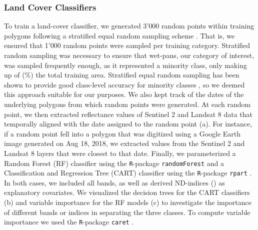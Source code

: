 \documentclass[abstract=on,10pt,a4paper,bibliography=totocnumbered]{article}
\newcommand{\inputy}[1]{\unskip}
\begin{document}
\begin{table}[h]
  \begin{center}
  \caption{We computed normalized difference indices between certain bands,
  hoping they would improve the land-cover classifiers. Depending on the
  satellite, we used different bands to compute similar indices. The function to
  compute a normalized difference between bands $b_1$ and $b_2$ is given by
  $\frac{b1 - b2}{b1 + b2}$.}
  \label{ND}
  \begin{threeparttable}[h]
    
  \end{threeparttable}
  \end{center}
\end{table}

\subsubsection{Land Cover Classifiers}

To train a land-cover classifier, we generated 3'000 random points within
training polygons following a stratified equal random sampling scheme
\citep{Shetty.2021}. That is, we ensured that 1'000 random points were sampled
per training category. Stratified random sampling was necessary to ensure that
wet-pans, our category of interest, was sampled frequently enough, as it
represented a minority class, only making up of
(\inputy{GeneralMetrics/PercentageTrainingWetpan}\%) the total training area.
Stratified equal random sampling has been shown to provide good class-level
accuracy for minority classes \citep{Shetty.2021}, so we deemed this approach
suitable for our purposes. We also kept track of the dates of the underlying
polygons from which random points were generated. At each random point, we then
extracted reflectance values of Sentinel 2 and Landsat 8 data that temporally
aligned with the date assigned to the random point (a). For
instance, if a random point fell into a polygon that was digitized using a
Google Earth image generated on Aug 18, 2018, we extracted values from the
Sentinel 2 and Landsat 8 layers that were closest to that date. Finally, we
parameterized a Random Forest (RF) classifier using the \texttt{R}-package
\texttt{randomForest} \citep{Cutler.2024} and a Classification and Regression
Tree (CART) classifier using the \texttt{R}-package \texttt{rpart}
\citep{Therneau.2024b}. In both cases, we included all bands, as well as derived
ND-indices () as explanatory covariates. We visualized the decision
trees for the CART classifiers (b) and variable importance
for the RF models (c) to investigate the importance of
different bands or indices in separating the three classes. To compute variable
importance we used the \texttt{R}-package \texttt{caret} \citep{Kuhn.2008}.
\end{document}
